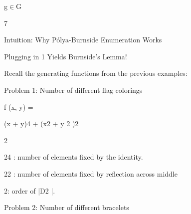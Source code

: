 \documentclass[a4paper,portrait,12pt]{article}
\begin{document}
\begin{flushleft}
g$\in$G
\end{flushleft}





7





\begin{flushleft}
Intuition: Why P\'{o}lya-Burnside Enumeration Works
\end{flushleft}





\begin{flushleft}
Plugging in 1 Yields Burnside's Lemma!
\end{flushleft}


\begin{flushleft}
Recall the generating functions from the previous examples:
\end{flushleft}


\begin{flushleft}
Problem 1: Number of different flag colorings
\end{flushleft}


\begin{flushleft}
f (x, y) =
\end{flushleft}





\begin{flushleft}
(x + y)4 + (x2 + y 2 )2
\end{flushleft}


2





\begin{flushleft}
24 : number of elements fixed by the identity.
\end{flushleft}


\begin{flushleft}
22 : number of elements fixed by reflection across middle
\end{flushleft}


\begin{flushleft}
2: order of |D2 |.
\end{flushleft}


\begin{flushleft}
Problem 2: Number of different bracelets
\end{flushleft}
\end{document}
